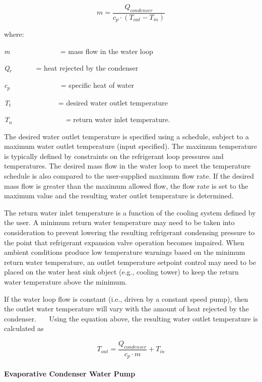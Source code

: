 \begin{equation}
m = \frac{{{Q_{condenser}}}}{{{c_p} \cdot ({T_{out}} - {T_{in}})}}
\end{equation}

where:

\emph{m} ~~~~~~~~~~~~~ = mass flow in the water loop

\emph{Q\(_{r}\)~~~~~~} = heat rejected by the condenser

\emph{c\(_{p}\)~~} ~~~~~~~~~~~ = specific heat of water

\emph{T\(_{t}\)~} ~~~~~~~~~~~ = desired water outlet temperature

\emph{T\(_{n}\)~~~~~~~~~~~~~~ =} return water inlet temperature.

The desired water outlet temperature is specified using a schedule, subject to a maximum water outlet temperature (input specified). The maximum temperature is typically defined by constraints on the refrigerant loop pressures and temperatures. The desired mass flow in the water loop to meet the temperature schedule is also compared to the user-supplied maximum flow rate. If the desired mass flow is greater than the maximum allowed flow, the flow rate is set to the maximum value and the resulting water outlet temperature is determined.

The return water inlet temperature is a function of the cooling system defined by the user. A minimum return water temperature may need to be taken into consideration to prevent lowering the resulting refrigerant condensing pressure to the point that refrigerant expansion valve operation becomes impaired. When ambient conditions produce low temperature warnings based on the minimum return water temperature, an outlet temperature setpoint control may need to be placed on the water heat sink object (e.g., cooling tower) to keep the return water temperature above the minimum.

If the water loop flow is constant (i.e., driven by a constant speed pump), then the outlet water temperature will vary with the amount of heat rejected by the condenser.~~~ Using the equation above, the resulting water outlet temperature is calculated as

\begin{equation}
{T_{out}} = \frac{{{Q_{condenser}}}}{{{c_p} \cdot m}} + {T_{in}}
\end{equation}

\paragraph{Evaporative Condenser Water Pump}\label{evaporative-condenser-water-pump}

